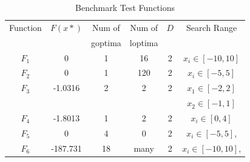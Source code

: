 \documentclass[a4j,11pt]{jarticle}
\begin{document}
\begin{table}[h]
\caption{Benchmark Test Functions}
\begin{center}
\begin{tabular}{c|c|c|c|c|c}
\hline

Function & $F(x*)$ & Num of & Num of & $D$ & Search Range \\
& & goptima & loptima & & \\
\hline
$F_1$ & 0 & 1 & 16 &  2 & $x_i \in [-10,10]$  \\
\hline
$F_2$ & 0 & 1 & 120 & 2 & $x_i \in [-5,5]$  \\
\hline
$F_3$ & -1.0316 & 2 & 2 & 2 & $x_1 \in [-2,2]$  \\
& & & & & $x_2 \in [-1,1]$ \\
\hline
$F_4$ & -1.8013 & 1 & 2 & 2 & $x_i \in [0,4]$  \\
\hline
$F_5$ & 0 & 4 & 0 & 2 & $x_i \in [-5,5]$, \\
\hline
$F_6$ & -187.731 & 18 & many & 2 & $x_i \in [-10,10]$, \\
\hline
\end{tabular}
\label{tab:minMOP}
\end{center}
\end{table}


\FloatBarrier
\end{document}
